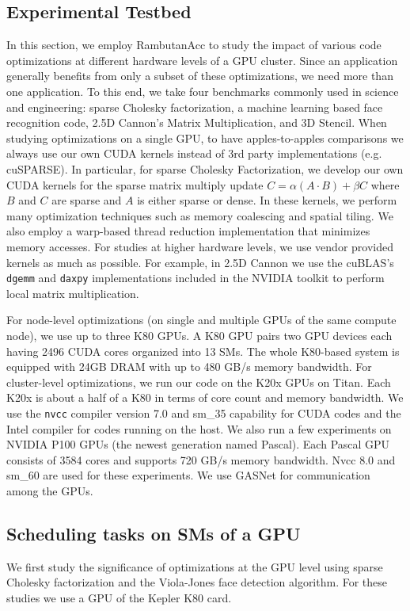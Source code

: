\subsection{Experimental Testbed}
In this section, we employ RambutanAcc to study the impact of various code optimizations at different hardware levels of a GPU cluster.
Since an application generally benefits from only a subset of these optimizations, we need more than one application.
To this end, we take four benchmarks commonly used in science and engineering: sparse Cholesky factorization, a machine learning based face recognition code, 2.5D Cannon's Matrix Multiplication, and 3D Stencil.
When studying optimizations on a single GPU, to have apples-to-apples comparisons we always use our own CUDA kernels instead of 3rd party implementations (e.g. cuSPARSE). 
In particular, for sparse Cholesky Factorization, we develop our own CUDA kernels for the sparse matrix multiply update $C = \alpha (A \cdot B) + \beta C$ where $B$ and $C$ are sparse and $A$ is either sparse or dense.
In these kernels, we perform many optimization techniques such as memory coalescing and spatial tiling.
We also employ a warp-based thread reduction implementation that minimizes memory accesses.
For studies at higher hardware levels, we use vendor provided kernels as much as possible.
For example, in  2.5D Cannon we use the cuBLAS's {\tt dgemm} and {\tt daxpy} implementations included in the NVIDIA toolkit to perform local matrix multiplication.

For node-level optimizations (on single and multiple GPUs of the same compute node), we use up to three K80 GPUs.
A K80 GPU pairs two GPU devices each having 2496 CUDA cores organized into 13 SMs.
The whole K80-based system is equipped with 24GB DRAM with up to 480 GB/s memory bandwidth.
For cluster-level optimizations, we run our code on the K20x GPUs on Titan.
Each K20x is about a half of a K80 in terms of core count and memory bandwidth.
We use the {\tt nvcc} compiler version 7.0 and sm\_35 capability for CUDA codes and the Intel compiler for codes running on the host.
We also run a few experiments on NVIDIA P100 GPUs (the newest generation named Pascal).
Each Pascal GPU consists of 3584 cores and supports 720 GB/s memory bandwidth.
Nvcc 8.0 and sm\_60 are used for these experiments.
We use GASNet for communication among the GPUs. 


\subsection{Scheduling tasks on SMs of a GPU}
We first study the significance of optimizations at the GPU level using sparse Cholesky factorization and the Viola-Jones face detection algorithm.
For these studies we use a GPU of the Kepler K80 card.

